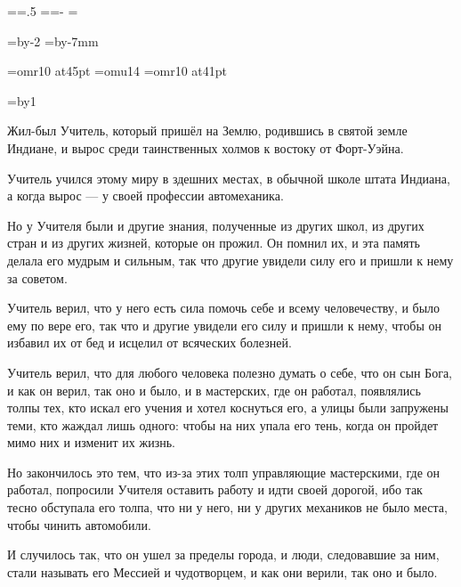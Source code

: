 \pdfpagewidth=297mm
\pdfpageheight=210mm
\pdfhorigin=1in \pdfvorigin=1in %

\shhtotal=\pdfpagewidth \htotal=.5\shhtotal
\vtotal=\pdfpageheight \shvoffset=-\pdfvorigin
\shoutline=0pt
\shstaplewidth=0pt
\shcrop=0pt
\shfootline={}

\horigin=3.5mm
\vorigin=2.5mm
\hsize=\htotal \advance\hsize by-2\horigin
\vsize=\vtotal \advance\vsize by-7mm

\font\chapfont=omr10 at45pt
\font\handfont=omu14
\font\bukvfont=omr10 at41pt

\nopagenumbers

\raggedbottom

{}
\vskip3cm

\begingroup
\baselineskip=17pt
\newcount\n
\everypar={\advance\n by1 \hang}
\parskip=30pt
\raggedright
\handfont

Жил-был Учитель, который пришёл на Землю, родившись в святой земле Индиане, и вырос среди таинственных холмов к востоку от Форт-Уэйна.

Учитель учился этому миру в здешних местах, в обычной школе штата Индиана, а когда вырос --- у своей профессии автомеханика.

Но у Учителя были и другие знания, полученные из других школ, из других стран и из других жизней, которые он прожил. Он помнил их, и эта память делала его мудрым и сильным, так что другие увидели силу его и пришли к нему за советом.

Учитель верил, что у него есть сила помочь себе и всему человечеству, и было ему по вере его, так что и другие увидели его силу и пришли к нему, чтобы он избавил их от бед и исцелил от всяческих болезней.

Учитель верил, что для любого человека полезно думать о себе, что он сын Бога, и как он верил, так оно и было, и в мастерских, где он работал, появлялись толпы тех, кто искал его учения и хотел коснуться его, а улицы были запружены теми, кто жаждал лишь одного: чтобы на них упала его тень, когда он пройдет мимо них и изменит их жизнь.

Но закончилось это тем, что из-за этих толп управляющие мастерскими, где он работал, попросили Учителя оставить работу и идти своей дорогой, ибо так тесно обступала его толпа, что ни у него, ни у других механиков не было места, чтобы чинить автомобили.

И случилось так, что он ушел за пределы города, и люди, следовавшие за ним, стали называть его Мессией и чудотворцем, и как они верили, так оно и было.

